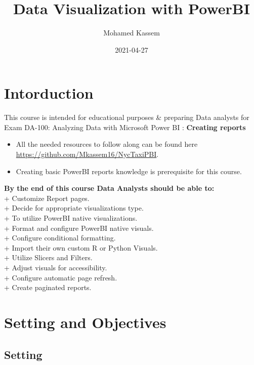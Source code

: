 \documentclass[
]{book}
\title{Data Visualization with PowerBI}
\author{Mohamed Kassem}
\date{2021-04-27}
\begin{document}
\maketitle

{
\setcounter{tocdepth}{1}
\tableofcontents
}
\hypertarget{intorduction}{%
\chapter{Intorduction}\label{intorduction}}

This course is intended for educational purposes \& preparing Data analysts for Exam DA-100: Analyzing Data with Microsoft Power BI : \textbf{Creating reports}

\begin{itemize}
\item
  All the needed resources to follow along can be found here \url{https://github.com/Mkassem16/NycTaxiPBI}.
\item
  Creating basic PowerBI reports knowledge is prerequisite for this course.
\end{itemize}

\textbf{By the end of this course Data Analysts should be able to:}\\
+ Customize Report pages.\\
+ Decide for appropriate visualizations type.\\
+ To utilize PowerBI native visualizations.\\
+ Format and configure PowerBI native visuals.\\
+ Configure conditional formatting.\\
+ Import their own custom R or Python Visuals.\\
+ Utilize Slicers and Filters.\\
+ Adjust visuals for accessibility.\\
+ Configure automatic page refresh.\\
+ Create paginated reports.

\hypertarget{setting-and-objectives}{%
\chapter{Setting and Objectives}\label{setting-and-objectives}}

\hypertarget{setting}{%
\section{Setting}\label{setting}}
\end{document}
